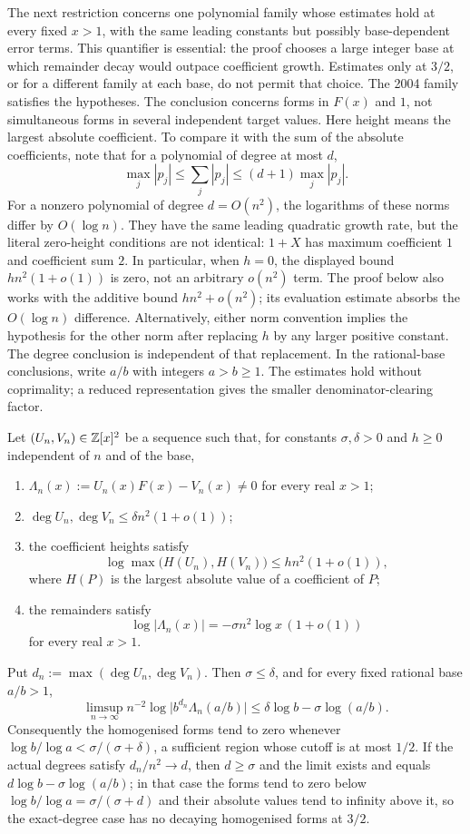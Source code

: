 \documentclass[11pt]{article}
\begin{document}
The next restriction concerns one polynomial family whose estimates
hold at every fixed $x>1$, with the same leading constants but
possibly base-dependent error terms. This quantifier is essential:
the proof chooses a large integer base at which remainder decay
would outpace coefficient growth. Estimates only at $3/2$, or for
a different family at each base, do not permit that choice. The
2004 family satisfies the hypotheses. The conclusion concerns
forms in $F(x)$ and $1$, not simultaneous forms in several
independent target values. Here height means the largest absolute
coefficient. To compare it with the sum of the absolute coefficients,
note that for a polynomial of degree at most $d$,
\[
 \max_j|p_j|\le\sum_j|p_j|\le(d+1)\max_j|p_j|.
\]
For a nonzero polynomial of degree $d=O(n^2)$, the logarithms of
these norms differ by $O(\log n)$. They have the same leading
quadratic growth rate, but the literal zero-height conditions are
not identical: $1+X$ has maximum coefficient $1$ and coefficient sum
$2$. In particular, when $h=0$, the displayed bound
$hn^2(1+o(1))$ is zero, not an arbitrary $o(n^2)$ term.
The proof below also works with the additive bound $hn^2+o(n^2)$;
its evaluation estimate absorbs the $O(\log n)$ difference.
Alternatively, either norm convention implies the hypothesis for the
other norm after replacing $h$ by any larger positive constant.
The degree conclusion is independent of that replacement.
In the rational-base conclusions, write $a/b$ with integers $a>b\ge1$.
The estimates hold without coprimality; a reduced representation gives
the smaller denominator-clearing factor.

\begin{theorem}\label{long1049:res:archcap}
Let $(U_n,V_n)\in\mathbb{Z}[x]^{2}$ be a sequence such that, for constants
$\sigma,\delta>0$ and $h\ge0$ independent of $n$ and of the base,
\begin{enumerate}
\item $\Lambda_n(x):=U_n(x)F(x)-V_n(x)\ne0$ for every real $x>1$;
\item $\deg U_n,\deg V_n\le\delta n^{2}(1+o(1))$;
\item the coefficient heights satisfy
\[
 \log\max\bigl(H(U_n),H(V_n)\bigr)\le hn^{2}(1+o(1)),
\]
where $H(P)$ is the
largest absolute value of a coefficient of $P$;
\item the remainders satisfy
\[
 \log|\Lambda_n(x)|=-\sigma n^{2}\log x\,(1+o(1))
\]
for every real $x>1$.
\end{enumerate}
Put $d_n:=\max(\deg U_n,\deg V_n)$.  Then $\sigma\le\delta$, and for every fixed
rational base $a/b>1$,
\[
 \limsup_{n\to\infty}n^{-2}\log\bigl|b^{d_n}\Lambda_n(a/b)\bigr|
 \le\delta\log b-\sigma\log(a/b).
\]
Consequently the homogenised forms tend to zero whenever
$\log b/\log a<\sigma/(\sigma+\delta)$, a sufficient region whose cutoff is at
most $1/2$.  If the actual degrees satisfy $d_n/n^{2}\to d$, then $d\ge\sigma$
and the limit exists and equals $d\log b-\sigma\log(a/b)$; in that case the
forms tend to zero below $\log b/\log a=\sigma/(\sigma+d)$ and their absolute
values tend to infinity above it, so the exact-degree case has no decaying
homogenised forms at $3/2$.
\end{theorem}
\end{document}
